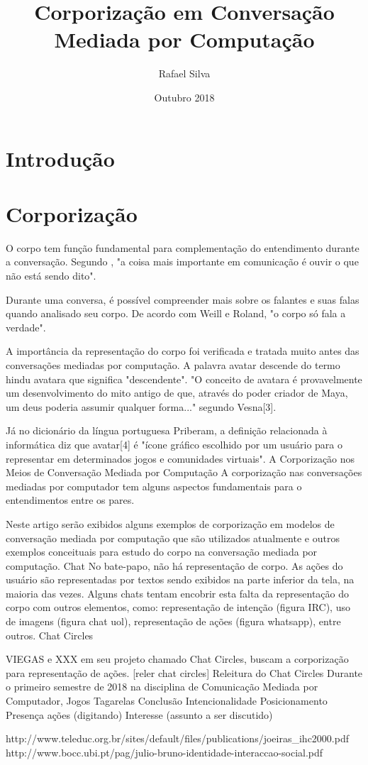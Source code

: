 \documentclass{article}
\title{Corporização em Conversação Mediada por Computação}
\author{Rafael Silva}
\date{Outubro 2018}
\begin{document}
\maketitle

\section{Introdução}



\section{Corporização}

O corpo tem função fundamental para complementação do entendimento durante a conversação. Segundo \cite{}, "a coisa mais importante em comunicação é ouvir o que não está sendo dito".

Durante uma conversa, é possível compreender mais sobre os falantes e suas falas quando analisado seu corpo. De acordo com Weill e Roland, "o corpo só fala a verdade".

A importância da representação do corpo foi verificada e tratada muito antes das conversações mediadas por computação. A palavra avatar descende do termo hindu avatara que significa "descendente". "O conceito de avatara é provavelmente um desenvolvimento do mito antigo de que, através do poder criador de Maya, um deus poderia assumir qualquer forma..." segundo Vesna[3].

Já no dicionário da língua portuguesa Priberam, a definição relacionada à informática diz que avatar[4] é "ícone gráfico escolhido por um usuário para o representar em determinados jogos e comunidades virtuais".
A Corporização nos Meios de Conversação Mediada por Computação
A corporização nas conversações mediadas por computador tem alguns aspectos fundamentais para o entendimentos entre os pares.

Neste artigo serão exibidos alguns exemplos de corporização em modelos de conversação mediada por computação que são utilizados atualmente e outros exemplos conceituais para estudo do corpo na conversação mediada por computação.
Chat
No bate-papo, não há representação de corpo. As ações do usuário são representadas por textos sendo exibidos na parte inferior da tela, na maioria das vezes. Alguns chats tentam encobrir esta falta da representação do corpo com outros elementos, como: representação de intenção (figura IRC), uso de imagens (figura chat uol), representação de ações (figura whatsapp), entre outros.
Chat Circles

VIEGAS e XXX em seu projeto chamado Chat Circles, buscam a corporização para representação de ações. [reler chat circles]
Releitura do Chat Circles
Durante o primeiro semestre de 2018 na disciplina de Comunicação Mediada por Computador, 
Jogos
Tagarelas
Conclusão
Intencionalidade
Posicionamento
Presença
ações (digitando)
Interesse (assunto a ser discutido)





http://www.teleduc.org.br/sites/default/files/publications/joeiras\_ihc2000.pdf
http://www.bocc.ubi.pt/pag/julio-bruno-identidade-interaccao-social.pdf
\end{document}

